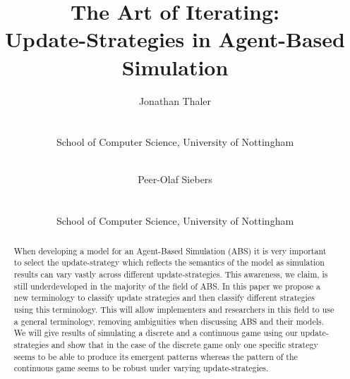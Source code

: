 \documentclass[a4paper, 10pt, conference]{IEEEconf}
\title{The Art of Iterating:\\Update-Strategies in Agent-Based Simulation}
\author{
	Jonathan Thaler \\
	\email{jonathan.thaler@nottingham.ac.uk} \\
	\begin{affiliation}
		School of Computer Science, University of Nottingham
	\end{affiliation} \\
	\and 
	Peer-Olaf Siebers \\
	\email{peer-olaf.siebers@nottingham.ac.uk} \\
	\begin{affiliation}
		School of Computer Science, University of Nottingham
	\end{affiliation} 
}
\begin{document}
\maketitle

\begin{abstract}
When developing a model for an Agent-Based Simulation (ABS) it is very important to select the update-strategy which reflects the semantics of the model as simulation results can vary vastly across different update-strategies. This awareness, we claim, is still underdeveloped in the majority of the field of ABS. In this paper we propose a new terminology to classify update strategies and then classify different strategies using this terminology. This will allow implementers and researchers in this field to use a general terminology, removing ambiguities when discussing ABS and their models. We will give results of simulating a discrete and a continuous game using our update-strategies and show that in the case of the discrete game only one specific strategy seems to be able to produce its emergent patterns whereas the pattern of the continuous game seems to be robust under varying update-strategies.
\end{abstract}














%
%
\end{document}
